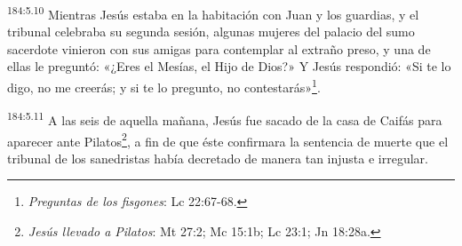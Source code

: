 \par 
\textsuperscript{184:5.10} Mientras Jesús estaba en la habitación con Juan y los guardias, y el tribunal celebraba su segunda sesión, algunas mujeres del palacio del sumo sacerdote vinieron con sus amigas para contemplar al extraño preso, y una de ellas le preguntó: «¿Eres el Mesías, el Hijo de Dios?» Y Jesús respondió: «Si te lo digo, no me creerás; y si te lo pregunto, no contestarás»\footnote{\textit{Preguntas de los fisgones}: Lc 22:67-68.}.

\par 
\textsuperscript{184:5.11} A las seis de aquella mañana, Jesús fue sacado de la casa de Caifás para aparecer ante Pilatos\footnote{\textit{Jesús llevado a Pilatos}: Mt 27:2; Mc 15:1b; Lc 23:1; Jn 18:28a.}, a fin de que éste confirmara la sentencia de muerte que el tribunal de los sanedristas había decretado de manera tan injusta e irregular.